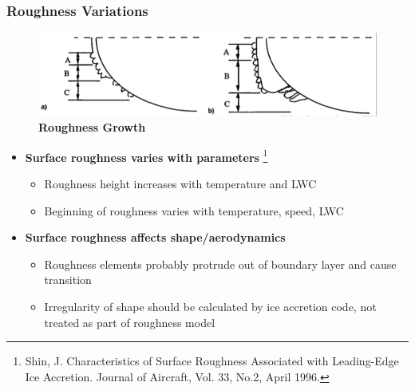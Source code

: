 \documentclass[9pt]{beamer}
\begin{document}
\begin{frame}
\frametitle{Roughness Variations}
\label{sec-2-4}

\begin{figure}
  \centering
  \includegraphics[width=1\textwidth]{IcingRoughness.png} \\
  {\bf Roughness Growth}
\end{figure}

\begin{itemize}
\item \textbf{Surface roughness varies with parameters} \footnote{Shin, J. Characteristics of Surface Roughness Associated
with Leading-Edge Ice Accretion. Journal of Aircraft, Vol. 33, No.2,
April 1996.
 }
\begin{itemize}
\item Roughness height increases with temperature and LWC
\item Beginning of roughness varies with temperature, speed, LWC
\end{itemize}
\item \textbf{Surface roughness affects shape/aerodynamics} \footnotemark[8]
\begin{itemize}
\item Roughness elements probably protrude out of boundary layer and cause transition
\item Irregularity of shape should be calculated by ice accretion code, not treated as part of roughness model
\end{itemize}
\end{itemize}
\end{frame}
\end{document}
